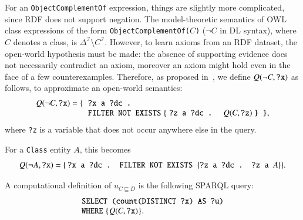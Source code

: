 \documentclass[review]{elsarticle}
\theoremstyle{definition}
\begin{document}
For an \texttt{ObjectComplementOf} expression, things are slightly more complicated, since RDF does not support
negation. The model-theoretic semantics of OWL class expressions of the form \texttt{ObjectComplementOf(}$C$\texttt{)}
($\neg C$ in DL syntax), where $C$ denotes a class, is $\Delta^\mathcal{I} \setminus C^\mathcal{I}$.
However, to learn axioms from an RDF dataset, the open-world hypothesis must be made: the absence of
supporting evidence does not necessarily contradict an axiom, moreover an axiom might
hold even in the face of a few counterexamples.
Therefore, as proposed in~\cite{TettamanziFaronZuckerGandon2014ekaw}, we define
$Q(\neg C, \mbox{\tt ?x})$ as follows, to approximate an open-world semantics:
\begin{equation}\label{eq:approx-open-world-negation}
  Q(\neg C, \mbox{\tt ?x}) =
  \begin{minipage}[t]{2in}
    \begin{tabbing}
      \quad\=\quad\=\quad\=\kill
      \{\>\texttt{?x a ?dc .}\\
        \>\texttt{FILTER NOT EXISTS} \{ \texttt{?z a ?dc . } $Q(C, \mbox{\tt ?z})$ \texttt{\} \}},
    \end{tabbing}
  \end{minipage}
\end{equation}
where \texttt{?z} is a variable that does not occur anywhere else in the query.

For a \texttt{Class} entity $A$, this becomes
\begin{equation}
Q(\neg A, \mbox{\tt ?x}) = \{\>\texttt{?x a ?dc . } \mbox{\tt FILTER NOT EXISTS } \{ \mbox{\tt ?z a ?dc . ?z a }A \} \}.
\end{equation}

A computational definition of $u_{C \sqsubseteq D}$ is the following SPARQL query:
\begin{equation}
  \begin{minipage}[c]{5in}
    \begin{tabbing}
      \quad\=\quad\=\quad\=\kill
      \texttt{SELECT (count(DISTINCT ?x) AS ?u)}\\
      \texttt{WHERE} \{$Q(C, \mbox{\tt ?x})$\}.
    \end{tabbing}
  \end{minipage}
\end{equation}
\end{document}
